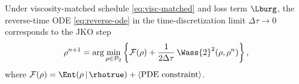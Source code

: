 \begin{theorem}
\label{thm:jko}
Under viscosity-matched schedule \eqref{eq:visc-matched} and loss term $\Lburg$, the reverse-time ODE \eqref{eq:reverse-ode} in the time-discretization limit $\Delta\tau \to 0$ corresponds to the {JKO} step
\begin{equation}
\label{eq:jko}
\rho^{n+1} = \arg\min_{\rho \in \mathcal{P}_{2}}
            \left\{ \mathcal{F}(\rho) + \frac{1}{2\Delta\tau}\,\Wass{2}^{2}(\rho, \rho^{n}) \right\},
\end{equation}
where $\mathcal{F}(\rho) = \Ent(\rho \,|\, \rhotrue) + \langle \text{PDE constraint} \rangle$.
\end{theorem}

